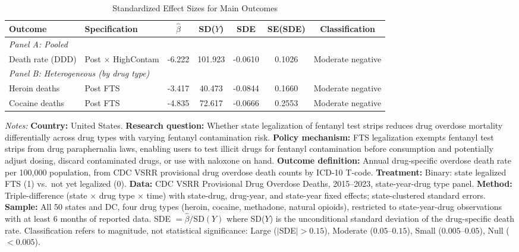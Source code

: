 \begin{table}[H]
\centering
\caption{Standardized Effect Sizes for Main Outcomes}
\label{tab:sde}
\begin{adjustbox}{max width=\textwidth}
\begin{threeparttable}
\begin{tabular}{llccccc}
\toprule
Outcome & Specification & $\hat{\beta}$ & SD($Y$) & SDE & SE(SDE) & Classification \\
\midrule
\multicolumn{7}{l}{\textit{Panel A: Pooled}} \\
Death rate (DDD) & Post $\times$ HighContam & -6.222 & 101.923 & -0.0610 & 0.1026 & Moderate negative \\
\midrule
\multicolumn{7}{l}{\textit{Panel B: Heterogeneous (by drug type)}} \\
Heroin deaths & Post FTS & -3.417 & 40.473 & -0.0844 & 0.1660 & Moderate negative \\
Cocaine deaths & Post FTS & -4.835 & 72.617 & -0.0666 & 0.2553 & Moderate negative \\
\bottomrule
\end{tabular}
\begin{tablenotes}[flushleft]
\footnotesize
\item \textit{Notes:} \textbf{Country:} United States.
\textbf{Research question:} Whether state legalization of fentanyl test strips reduces drug overdose mortality differentially across drug types with varying fentanyl contamination risk.
\textbf{Policy mechanism:} FTS legalization exempts fentanyl test strips from drug paraphernalia laws, enabling users to test illicit drugs for fentanyl contamination before consumption and potentially adjust dosing, discard contaminated drugs, or use with naloxone on hand.
\textbf{Outcome definition:} Annual drug-specific overdose death rate per 100,000 population, from CDC VSRR provisional drug overdose death counts by ICD-10 T-code.
\textbf{Treatment:} Binary: state legalized FTS (1) vs.\ not yet legalized (0).
\textbf{Data:} CDC VSRR Provisional Drug Overdose Deaths, 2015--2023, state-year-drug type panel.
\textbf{Method:} Triple-difference (state $\times$ drug type $\times$ time) with state-drug, drug-year, and state-year fixed effects; state-clustered standard errors.
\textbf{Sample:} All 50 states and DC, four drug types (heroin, cocaine, methadone, natural opioids), restricted to state-year-drug observations with at least 6 months of reported data.
SDE $= \hat{\beta} / \text{SD}(Y)$ where SD($Y$) is the unconditional standard deviation of the drug-specific death rate.
Classification refers to magnitude, not statistical significance: Large ($|$SDE$| > 0.15$), Moderate ($0.05$--$0.15$), Small ($0.005$--$0.05$), Null ($< 0.005$).
\end{tablenotes}
\end{threeparttable}
\end{adjustbox}
\end{table}

